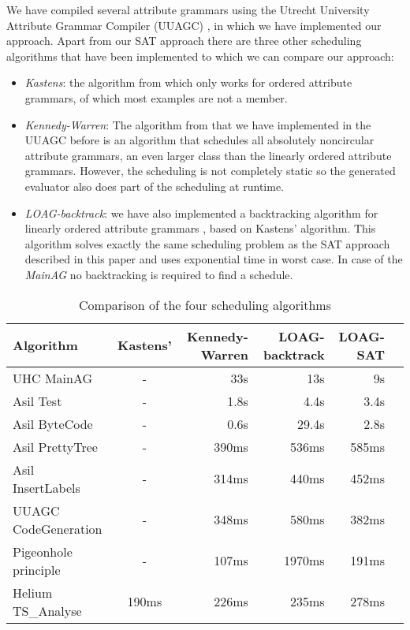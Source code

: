 \documentclass{llncs}
\begin{document}
We have compiled several attribute grammars using the Utrecht University Attribute Grammar Compiler (UUAGC) \cite{combinator-languages}, in which we have implemented our approach. Apart from our SAT approach there are three other scheduling algorithms that have been implemented to which we can compare our approach:

\begin{itemize}
\item \emph{Kastens}: the algorithm from \cite{kastens80} which only works for ordered attribute grammars, of which most examples are not a member.
\item \emph{Kennedy-Warren}: The algorithm from \cite{kennedywarren76} that we have implemented in the UUAGC before \cite{bransen2012} is an algorithm that schedules all absolutely noncircular attribute grammars, an even larger class than the linearly ordered attribute grammars. However, the scheduling is not completely static so the generated evaluator also does part of the scheduling at runtime. 
\item \emph{LOAG-backtrack}: we have also implemented a backtracking algorithm for linearly ordered attribute grammars \cite{Binsbergen:2015}, based on Kastens' algorithm. This algorithm solves exactly the same scheduling problem as the SAT approach described in this paper and uses exponential time in worst case. In case of the \emph{MainAG} no backtracking is required to find a schedule.
\end{itemize} 

\begin{table}
  \begin{center}
    \begin{tabular}{l || c || r || r || r || r}
      Algorithm   &   Kastens' & Kennedy-Warren & LOAG-backtrack & LOAG-SAT\\
      \hline
      UHC MainAG          &   -       & 33s   & 13s   & 9s    \\
      Asil Test             &   -       & 1.8s  & 4.4s  & 3.4s  \\
      Asil ByteCode         &   -       & 0.6s  & 29.4s & 2.8s  \\
      Asil PrettyTree       &   -       & 390ms & 536ms & 585ms \\
      Asil InsertLabels     &   -       & 314ms & 440ms & 452ms \\
      UUAGC CodeGeneration&   -       & 348ms & 580ms & 382ms \\
      Pigeonhole principle         &   -       & 107ms & 1970ms& 191ms \\ 
      Helium TS\_Analyse  &   190ms   & 226ms & 235ms & 278ms \\
    \end{tabular}
  \end{center}
  \caption{Comparison of the four scheduling algorithms}
  \label{tab:algo-comparison}
\end{table}
\end{document}
